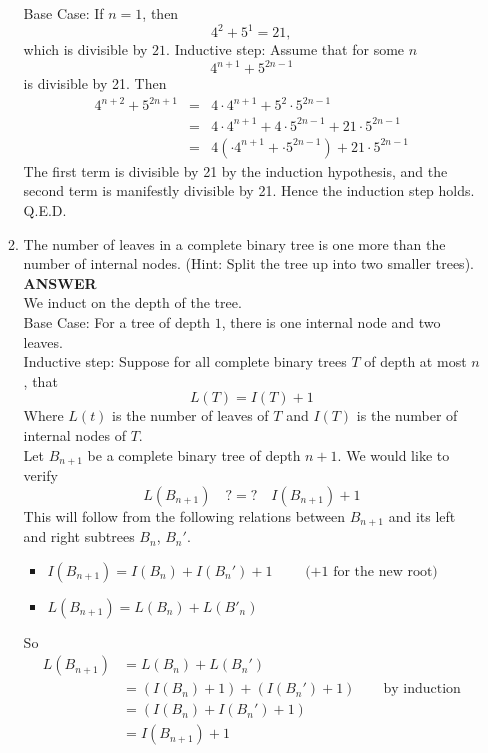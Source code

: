\documentclass{article}
\begin{document}
\begin{enumerate}
\begin{enumerate}
  Base Case:  If $n = 1$, then
     $$4^{2} + 5^{1} = 21,$$ which is divisible by $21$.
  Inductive step: Assume that for some $n$
  \[
  4^{n+1} + 5^{2n-1}
  \]
  is divisible by 21.
  Then
  \begin{eqnarray*}
  4^{n+2} + 5^{2n+1} & = & 4\cdot 4^{n+1} + 5^2 \cdot 5^{2n-1} \\
                     & = & 4 \cdot 4^{n+1} + 4 \cdot 5^{2n-1} + 21
                     \cdot 5^{2n-1} \\
                     & = & 4 ( \cdot 4^{n+1} + \cdot 5^{2n-1} ) + 21
                     \cdot 5^{2n-1}
  \end{eqnarray*}
  The first term is divisible by 21 by the induction hypothesis,
  and the second term is manifestly divisible by 21. Hence the
  induction step holds. Q.E.D.


\item The number of leaves in a
complete binary tree is one more than the number of internal
nodes. (Hint: Split the tree up into
two smaller trees).\\
\vskip 10pt  \textbf{ANSWER} \\
We induct on the depth of the tree. \\
Base Case: For a tree of depth $1$, there is one internal node and
two leaves. \\
Inductive step: Suppose for all complete binary trees $T$ of depth
at most $n$, that
\[
L(T) = I(T) + 1
\]
Where $L(t)$ is the number of leaves of $T$ and $I(T)$ is the
number of internal nodes of $T$.\\
Let $B_{n+1}$ be a complete binary tree of depth $n+1$. We would
like to verify
\[
L(B_{n+1}) \quad ?=? \quad I(B_{n+1}) + 1
\]
This will follow from the following relations between $B_{n+1}$
and its left and right subtrees $B_n$, $B_n'$.
\begin{itemize}
\item $I(B_{n+1}) = I(B_n) + I(B_n') + 1 \qquad \textrm{ (+1 for the
new root) }$
\item $ L(B_{n+1}) = L(B_n) + L(B'_n) $
\end{itemize}
So
\begin{align*}
    L(B_{n+1}) & = L(B_n) + L(B_n') \\
               & = (I(B_n) + 1) + (I(B_n') + 1) \qquad \textrm{by
               induction} \\
               & = (I(B_n) + I(B_n') + 1) \\
               & = I(B_{n+1}) + 1
\end{align*}


\end{enumerate}
\end{enumerate}
\end{document}

